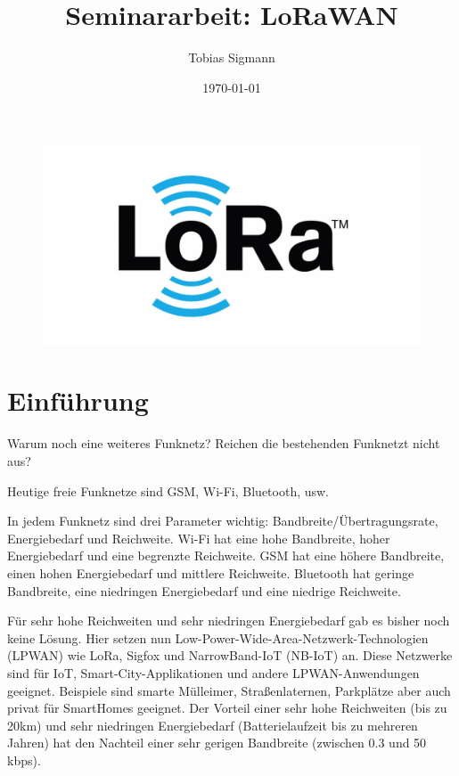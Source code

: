 \documentclass[a4paper, 12pt]{article}
\author{Tobias Sigmann}
\title{Seminararbeit: LoRaWAN}
\date{\today}
\begin{document}
    \maketitle
    \begin{figure}[ht]
        \centering
        \includegraphics[width=\textwidth]{LoRa}
    \end{figure}
    \newpage
    \tableofcontents
    \newpage

    \section{Einführung}
        Warum noch eine weiteres Funknetz? 
        Reichen die bestehenden Funknetzt nicht aus?

        Heutige freie Funknetze sind GSM, Wi-Fi, Bluetooth, usw.
        
        In jedem Funknetz sind drei Parameter wichtig: Bandbreite/Übertragungsrate, Energiebedarf und Reichweite.
        Wi-Fi hat eine hohe Bandbreite, hoher Energiebedarf und eine begrenzte Reichweite. 
        GSM hat eine höhere Bandbreite, einen hohen Energiebedarf und mittlere Reichweite.
        Bluetooth hat geringe Bandbreite, eine niedringen Energiebedarf und eine niedrige Reichweite.
        
        Für sehr hohe Reichweiten und sehr niedringen Energiebedarf gab es bisher noch keine Lösung.
        Hier setzen nun Low-­Power-Wide-Area-Netzwerk-Technologien
        (LPWAN) wie LoRa, Sigfox und NarrowBand-IoT (NB-IoT) an. Diese Netzwerke sind für IoT,
        Smart-City-Applikationen und andere LPWAN-Anwendungen geeignet.
        Beispiele sind smarte Mülleimer, Straßenlaternen, Parkplätze aber auch privat für SmartHomes geeignet.
        Der Vorteil einer sehr hohe Reichweiten (bis zu 20km) und sehr niedringen Energiebedarf (Batterielaufzeit
        bis zu mehreren Jahren) hat den Nachteil einer sehr gerigen Bandbreite (zwischen 0.3 und 50 kbps). 
\end{document}
